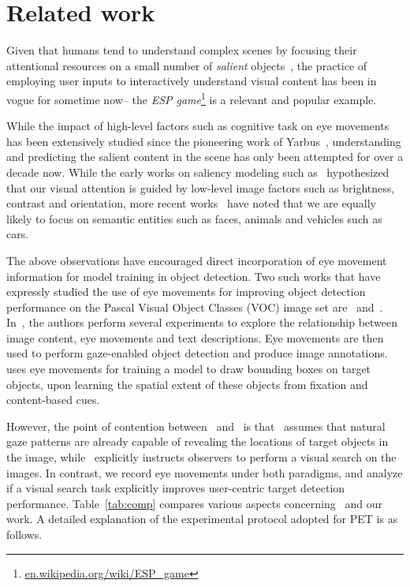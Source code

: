 \documentclass{article}
\begin{document}
 

\section{Related work}\label{RW}
Given that humans tend to understand complex scenes by focusing their attentional resources on a small number of \textit{salient} objects~\cite{spainPerona08}, the practice of employing user inputs to interactively understand visual content has been in vogue for sometime now-- the \textit{ESP game}\footnote{\url{en.wikipedia.org/wiki/ESP_game}} is a relevant and popular example. 

While the impact of high-level factors such as cognitive task on eye movements has been extensively studied since the pioneering work of Yarbus~\cite{Yarbus1967}, understanding and predicting the salient content in the scene has only been attempted for over a decade now. While the early works on saliency modeling such as~\cite{Itti1998} hypothesized that our visual attention is guided by low-level image factors such as brightness, contrast and orientation, more recent works~\cite{Judd_2009,ramanathan2010eye} have noted that we are equally likely to focus on semantic entities such as faces, animals and vehicles such as cars. 

The above observations have encouraged direct incorporation of eye movement information for model training in object detection. Two such works that have expressly studied the use of eye movements for improving object detection performance on the Pascal Visual Object Classes (VOC) image set are~\cite{kiwon_cvpr13_gaze} and~\cite{ PapadopoulosCKF14}. In~\cite{kiwon_cvpr13_gaze}, the authors perform several experiments to explore the relationship between image content, eye movements and text descriptions. Eye movements are then used to perform gaze-enabled object detection and produce image annotations.~\cite{PapadopoulosCKF14} uses eye movements for training a model to draw bounding boxes on target objects, upon learning the spatial extent of these objects from fixation and content-based cues.  

However, the point of contention between~\cite{kiwon_cvpr13_gaze} and~\cite{PapadopoulosCKF14} is that~\cite{kiwon_cvpr13_gaze} assumes that natural gaze patterns are already capable of revealing the locations of target objects in the image, while~\cite{PapadopoulosCKF14} explicitly instructs observers to perform a visual search on the images. In contrast, we record eye movements under both paradigms, and analyze if a visual search task explicitly improves user-centric target detection performance. Table~\ref{tab:comp} compares various aspects concerning~\cite{kiwon_cvpr13_gaze,PapadopoulosCKF14} and our work. A detailed explanation of the experimental protocol adopted for PET is as follows.    
\end{document}
